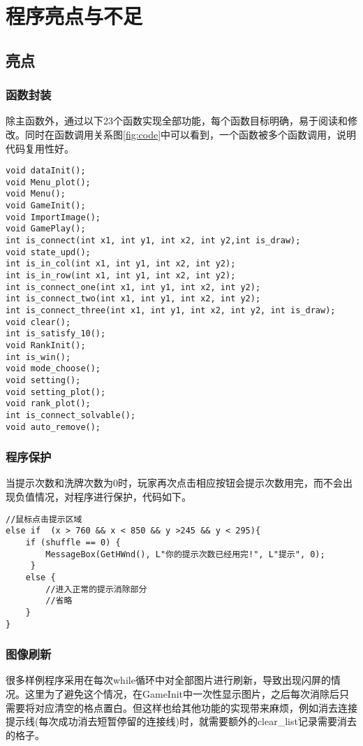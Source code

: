 \section{程序亮点与不足}
\subsection{亮点}
\subsubsection{函数封装}
除主函数外，通过以下23个函数实现全部功能，每个函数目标明确，易于阅读和修改。同时在函数调用关系图\ref{fig:code}中可以看到，一个函数被多个函数调用，说明代码复用性好。

\lstset{language=C}
\begin{lstlisting}
void dataInit();
void Menu_plot();
void Menu();
void GameInit();
void ImportImage();
void GamePlay();
int is_connect(int x1, int y1, int x2, int y2,int is_draw);
void state_upd();
int is_in_col(int x1, int y1, int x2, int y2); 
int is_in_row(int x1, int y1, int x2, int y2);
int is_connect_one(int x1, int y1, int x2, int y2); 
int is_connect_two(int x1, int y1, int x2, int y2); 
int is_connect_three(int x1, int y1, int x2, int y2, int is_draw); 
void clear();
int is_satisfy_10(); 
void RankInit();
int is_win();
void mode_choose();
void setting();
void setting_plot();
void rank_plot();
int is_connect_solvable();
void auto_remove();
\end{lstlisting}

\subsubsection{程序保护}
当提示次数和洗牌次数为0时，玩家再次点击相应按钮会提示次数用完，而不会出现负值情况，对程序进行保护，代码如下。
\lstset{language=C}
\begin{lstlisting}
//鼠标点击提示区域
else if  (x > 760 && x < 850 && y >245 && y < 295){
    if (shuffle == 0) {
        MessageBox(GetHWnd(), L"你的提示次数已经用完!", L"提示", 0);
     }
    else {
        //进入正常的提示消除部分
        //省略
    }
}
\end{lstlisting}

\subsubsection{图像刷新}
很多样例程序采用在每次while循环中对全部图片进行刷新，导致出现闪屏的情况。这里为了避免这个情况，在GameInit中一次性显示图片，之后每次消除后只需要将对应清空的格点置白。但这样也给其他功能的实现带来麻烦，例如消去连接提示线(每次成功消去短暂停留的连接线)时，就需要额外的clear\_list记录需要消去的格子。


